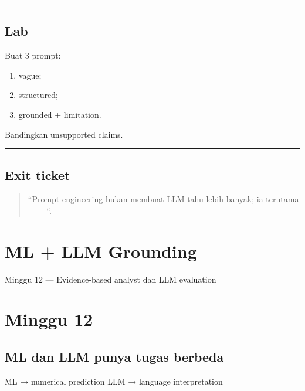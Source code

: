 \documentclass[
  indonesian,
  letterpaper,
  DIV=11,
  numbers=noendperiod]{scrreprt}
\newenvironment{Shaded}{\begin{snugshade}}{\end{snugshade}}
\newcommand{\NormalTok}[1]{\textcolor[rgb]{0.00,0.23,0.31}{#1}}
\providecommand{\tightlist}{%
  \setlength{\itemsep}{0pt}\setlength{\parskip}{0pt}}
\begin{document}
\begin{center}\rule{0.5\linewidth}{0.5pt}\end{center}

\section{Lab}\label{lab-7}

Buat 3 prompt:

\begin{enumerate}
\def\labelenumi{\arabic{enumi}.}
\tightlist
\item
  vague;
\item
  structured;
\item
  grounded + limitation.
\end{enumerate}

Bandingkan unsupported claims.

\begin{center}\rule{0.5\linewidth}{0.5pt}\end{center}

\section{Exit ticket}\label{exit-ticket-3}

\begin{quote}
``Prompt engineering bukan membuat LLM tahu lebih banyak; ia terutama
\_\_\_``.
\end{quote}

\chapter{ML + LLM Grounding}\label{ml-llm-grounding}

Minggu 12 --- Evidence-based analyst dan LLM evaluation

\hfill\break

\chapter{Minggu 12}\label{minggu-12}

\section{ML dan LLM punya tugas
berbeda}\label{ml-dan-llm-punya-tugas-berbeda}

\begin{Shaded}
\begin{Highlighting}[]
\NormalTok{ML → numerical prediction}
\NormalTok{LLM → language interpretation}
\end{Highlighting}
\end{Shaded}
\end{document}
